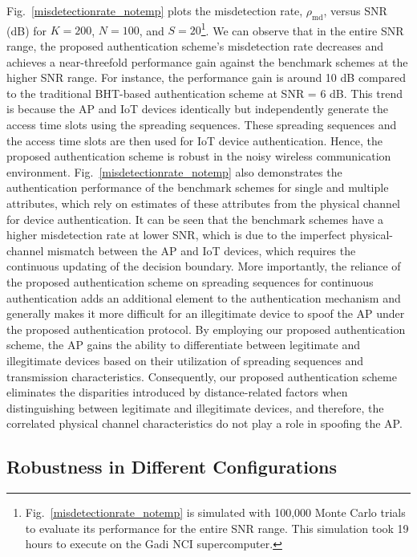 \documentclass[journal,10pt]{IEEEtran}
\begin{document}
Fig.~\ref{misdetectionrate_notemp} plots the misdetection rate, $\rho_{\mathrm{md}}$, versus SNR (dB) for $K = 200$, $N = 100$, and $S = 20$\footnote{Fig.~\ref{misdetectionrate_notemp} is simulated with 100,000 Monte Carlo trials to evaluate its performance for the entire SNR range. This simulation took 19 hours to execute on the Gadi NCI supercomputer.}. We can observe that in the entire SNR range, the proposed authentication scheme's misdetection rate decreases and achieves a near-threefold performance gain against the benchmark schemes at the higher SNR range. For instance, the performance gain is around 10 dB compared to the traditional BHT-based authentication scheme at SNR = 6 dB. This trend is because the AP and IoT devices identically but independently generate the access time slots using the spreading sequences. These spreading sequences and the access time slots are then used for IoT device authentication. Hence, the proposed authentication scheme is robust in the noisy wireless communication environment. Fig.~\ref{misdetectionrate_notemp} also demonstrates the authentication performance of the benchmark schemes for single and multiple attributes, which rely on estimates of these attributes from the physical channel for device authentication. It can be seen that the benchmark schemes have a higher misdetection rate at lower SNR, which is due to the imperfect physical-channel mismatch between the AP and IoT devices, which requires the continuous updating of the decision boundary. More importantly, the reliance of the proposed authentication scheme on spreading sequences for continuous authentication adds an additional element to the authentication mechanism and generally makes it more difficult for an illegitimate device to spoof the AP under the proposed authentication protocol. By employing our proposed authentication scheme, the AP gains the ability to differentiate between legitimate and illegitimate devices based on their utilization of spreading sequences and transmission characteristics. Consequently, our proposed authentication scheme eliminates the disparities introduced by distance-related factors when distinguishing between legitimate and illegitimate devices, and therefore, the correlated physical channel characteristics do not play a role in spoofing the AP.


\subsection{Robustness in Different Configurations}
\end{document}
